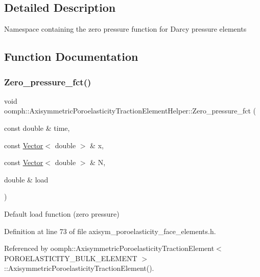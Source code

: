 \subsection{Detailed Description}
Namespace containing the zero pressure function for Darcy pressure elements 

\subsection{Function Documentation}
\mbox{\label{namespaceoomph_1_1AxisymmetricPoroelasticityTractionElementHelper_a8f4239ad8976b18eb097acb4b6446a6d}} 
\subsubsection{\texorpdfstring{Zero\+\_\+pressure\+\_\+fct()}{Zero\_pressure\_fct()}}
{\footnotesize\ttfamily void oomph\+::\+Axisymmetric\+Poroelasticity\+Traction\+Element\+Helper\+::\+Zero\+\_\+pressure\+\_\+fct (\begin{DoxyParamCaption}\item[{const double \&}]{time,  }\item[{const \hyperlink{classoomph_1_1Vector}{Vector}$<$ double $>$ \&}]{x,  }\item[{const \hyperlink{classoomph_1_1Vector}{Vector}$<$ double $>$ \&}]{N,  }\item[{double \&}]{load }\end{DoxyParamCaption})}



Default load function (zero pressure) 



Definition at line 73 of file axisym\+\_\+poroelasticity\+\_\+face\+\_\+elements.\+h.



Referenced by oomph\+::\+Axisymmetric\+Poroelasticity\+Traction\+Element$<$ P\+O\+R\+O\+E\+L\+A\+S\+T\+I\+C\+I\+T\+Y\+\_\+\+B\+U\+L\+K\+\_\+\+E\+L\+E\+M\+E\+N\+T $>$\+::\+Axisymmetric\+Poroelasticity\+Traction\+Element().

